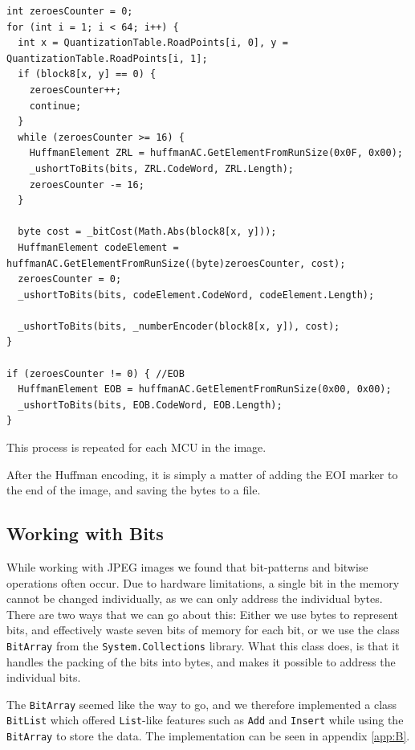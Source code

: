 \begin{lstlisting}[firstnumber=806,label=ACencoding,caption={Encoding AC coefficients into the image \textbf{File: }JPEGImage.cs}]
int zeroesCounter = 0;
for (int i = 1; i < 64; i++) {
  int x = QuantizationTable.RoadPoints[i, 0], y = QuantizationTable.RoadPoints[i, 1];
  if (block8[x, y] == 0) {
    zeroesCounter++;
    continue;
  }
  while (zeroesCounter >= 16) {
    HuffmanElement ZRL = huffmanAC.GetElementFromRunSize(0x0F, 0x00);
    _ushortToBits(bits, ZRL.CodeWord, ZRL.Length);
    zeroesCounter -= 16;
  }

  byte cost = _bitCost(Math.Abs(block8[x, y]));
  HuffmanElement codeElement = huffmanAC.GetElementFromRunSize((byte)zeroesCounter, cost);
  zeroesCounter = 0;
  _ushortToBits(bits, codeElement.CodeWord, codeElement.Length);

  _ushortToBits(bits, _numberEncoder(block8[x, y]), cost);
}

if (zeroesCounter != 0) { //EOB
  HuffmanElement EOB = huffmanAC.GetElementFromRunSize(0x00, 0x00);
  _ushortToBits(bits, EOB.CodeWord, EOB.Length);
}
\end{lstlisting}

This process is repeated for each MCU in the image.

After the Huffman encoding, it is simply a matter of adding the EOI marker to the end of the image, and saving the bytes to a file. 

\subsection{Working with Bits}
While working with JPEG images we found that bit-patterns and bitwise operations often occur.
Due to hardware limitations, a single bit in the memory cannot be changed individually, as we can only address the individual bytes.
There are two ways that we can go about this:
Either we use bytes to represent bits, and effectively waste seven bits of memory for each bit, or we use the class \lstinline|BitArray| from the \lstinline|System.Collections| library.
What this class does, is that it handles the packing of the bits into bytes, and makes it possible to address the individual bits.

The \lstinline|BitArray| seemed like the way to go, and we therefore implemented a class \lstinline|BitList| which offered \lstinline|List|-like features such as \lstinline|Add| and \lstinline|Insert| while using the \lstinline|BitArray| to store the data.
The implementation can be seen in appendix \ref{app:B}. 

